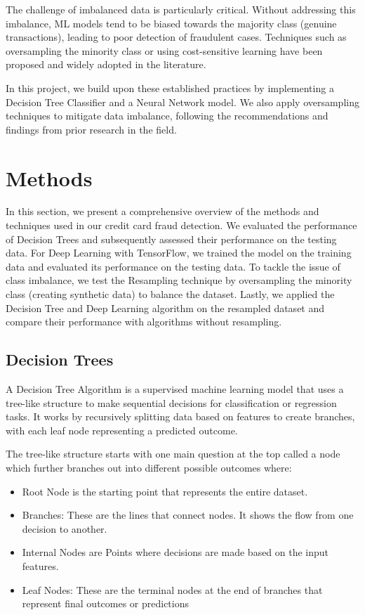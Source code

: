 \documentclass[11pt]{article}
\begin{document}
The challenge of imbalanced data is particularly critical. Without addressing this imbalance, ML models tend to be biased towards the majority class (genuine transactions), leading to poor detection of fraudulent cases. Techniques such as oversampling the minority class or using cost-sensitive learning have been proposed and widely adopted in the literature.

In this project, we build upon these established practices by implementing a Decision Tree Classifier and a Neural Network model. We also apply oversampling techniques to mitigate data imbalance, following the recommendations and findings from prior research in the field.

\section{Methods}
In this section, we present a comprehensive overview of the methods and techniques used in our credit card fraud detection. We evaluated the performance of Decision Trees and subsequently assessed their performance on the testing data. For Deep Learning with TensorFlow, we trained the model on the training data and evaluated its performance on the testing data. To tackle the issue of class imbalance, we test the Resampling technique by oversampling the minority class (creating synthetic data) to balance the dataset. Lastly, we applied the Decision Tree and Deep Learning algorithm on the resampled dataset and compare their performance with algorithms without resampling.

\subsection{Decision Trees}
A Decision Tree Algorithm is a supervised machine learning model that uses a tree-like structure to make sequential decisions for classification or regression tasks. It works by recursively splitting data based on features to create branches, with each leaf node representing a predicted outcome.

The tree-like structure starts with one main question at the top called a node which further branches out into different possible outcomes where:

\begin{itemize}
	\item Root Node is the starting point that represents the entire dataset.
	
	\item Branches: These are the lines that connect nodes. It shows the flow from one decision to another.
	
	\item Internal Nodes are Points where decisions are made based on the input features.
	\item Leaf Nodes: These are the terminal nodes at the end of branches that represent final outcomes or predictions
\end{itemize}
\end{document}
